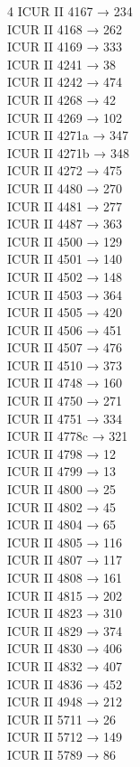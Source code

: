 \begin{multicols}{4}
ICUR II 4167 → 234\\
ICUR II 4168 → 262\\
ICUR II 4169 → 333\\
ICUR II 4241 → 38\\
ICUR II 4242 → 474\\
ICUR II 4268 → 42\\
ICUR II 4269 → 102\\
ICUR II 4271a → 347\\
ICUR II 4271b → 348\\
ICUR II 4272 → 475\\
ICUR II 4480 → 270\\
ICUR II 4481 → 277\\
ICUR II 4487 → 363\\
ICUR II 4500 → 129\\
ICUR II 4501 → 140\\
ICUR II 4502 → 148\\
ICUR II 4503 → 364\\
ICUR II 4505 → 420\\
ICUR II 4506 → 451\\
ICUR II 4507 → 476\\
ICUR II 4510 → 373\\
ICUR II 4748 → 160\\
ICUR II 4750 → 271\\
ICUR II 4751 → 334\\
ICUR II 4778c → 321\\
ICUR II 4798 → 12\\
ICUR II 4799 → 13\\
ICUR II 4800 → 25\\
ICUR II 4802 → 45\\
ICUR II 4804 → 65\\
ICUR II 4805 → 116\\
ICUR II 4807 → 117\\
ICUR II 4808 → 161\\
ICUR II 4815 → 202\\
ICUR II 4823 → 310\\
ICUR II 4829 → 374\\
ICUR II 4830 → 406\\
ICUR II 4832 → 407\\
ICUR II 4836 → 452\\
ICUR II 4948 → 212\\
ICUR II 5711 → 26\\
ICUR II 5712 → 149\\
ICUR II 5789 → 86\\

\end{multicols}
